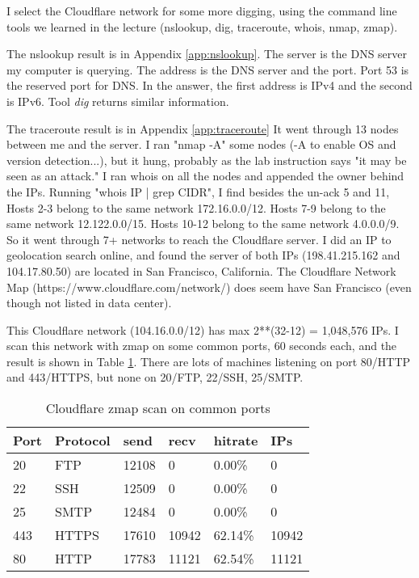 \documentclass[11pt]{article}
\begin{document}
I select the Cloudflare network for some more digging,
using the command line tools we learned in the lecture
(nslookup, dig, traceroute, whois, nmap, zmap).

The nslookup result is in Appendix \ref{app:nslookup}.
The server is the DNS server my computer is querying.
The address is the DNS server and the port.
Port 53 is the reserved port for DNS.
In the answer, the first address is IPv4 and the second is IPv6.
Tool \textit{dig} returns similar information.

The traceroute result is in Appendix \ref{app:traceroute}
It went through 13 nodes between me and the server.
I ran "nmap -A" some nodes (-A to enable OS and version detection...),
but it hung, probably as the lab instruction says "it may be seen as an attack."
I ran whois on all the nodes and appended the owner behind the IPs.
Running "whois IP | grep CIDR", I find besides the un-ack 5 and 11,
Hosts 2-3 belong to the same network 172.16.0.0/12.
Hosts 7-9 belong to the same network 12.122.0.0/15.
Hosts 10-12 belong to the same network 4.0.0.0/9.
So it went through 7+ networks to reach the Cloudflare server.
I did an IP to geolocation search online, and found the server of both IPs
(198.41.215.162 and 104.17.80.50) are located in San Francisco, California.
The Cloudflare Network Map (https://www.cloudflare.com/network/)
does seem have San Francisco (even though not listed in data center).

This Cloudflare network (104.16.0.0/12) has max 2**(32-12) = 1,048,576 IPs.
I scan this network with zmap on some common ports, 60 seconds each,
and the result is shown in Table \ref{tbl:scanports}.
There are lots of machines listening on port 80/HTTP and 443/HTTPS,
but none on 20/FTP, 22/SSH, 25/SMTP.

\begin{table}[]
\centering
\caption{\label{tbl:scanports}
Cloudflare zmap scan on common ports}
\begin{tabular}{|l|l|l|l|l|l|}
\hline
Port & Protocol & send  & recv  & hitrate & IPs   \\ \hline
20   & FTP      & 12108 & 0     & 0.00\%  & 0     \\ \hline
22   & SSH      & 12509 & 0     & 0.00\%  & 0     \\ \hline
25   & SMTP     & 12484 & 0     & 0.00\%  & 0     \\ \hline
443  & HTTPS    & 17610 & 10942 & 62.14\% & 10942 \\ \hline
80   & HTTP     & 17783 & 11121 & 62.54\% & 11121 \\ \hline
\end{tabular}
\end{table}
\end{document}
